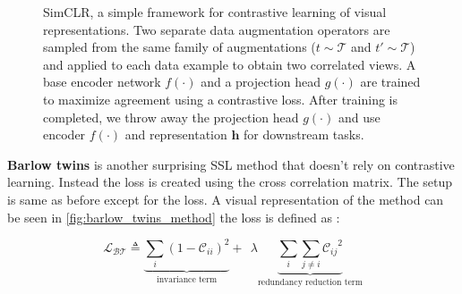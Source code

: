\documentclass[../thesis.tex]{subfiles}
\begin{document}
	\begin{figure}[!ht]
		\small
		\centering
		\caption{SimCLR, a simple framework for contrastive learning of visual representations. 
			Two separate data augmentation operators are sampled from the same family of augmentations ($t\sim \mathcal{T}$ and $t'\sim \mathcal{T}$) and applied to each data example to obtain two correlated views.
			A base encoder network $f(\cdot)$ and a projection head $g(\cdot)$ are trained to maximize agreement using a contrastive loss. After training is completed, we throw away the projection head $g(\cdot)$ and use encoder $f(\cdot)$ and representation $\bm h$ for downstream tasks.}
		\label{fig:simclr_framework}
	\end{figure}


	
	\textbf{Barlow twins} \cite{barlow_twins} is another surprising SSL method that doesn't rely on contrastive learning. Instead the loss is created using the cross correlation matrix. The setup is same as before except for the loss. A visual representation of the method can be seen in \ref{fig:barlow_twins_method} the loss is defined as :
	
	\begin{equation}
	\mathcal{L_{BT}} \triangleq  \underbrace{\sum_i  (1-\mathcal{C}_{ii})^2}_\text{invariance term}  + ~~\lambda \underbrace{\sum_{i}\sum_{j \neq i} {\mathcal{C}_{ij}}^2}_\text{redundancy reduction term}
	\label{eq:lossBarlow}
	\end{equation}
	
\end{document}
